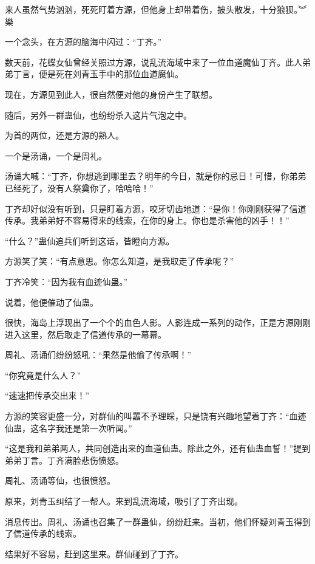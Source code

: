 
\begin{this_body}

来人虽然气势汹汹，死死盯着方源，但他身上却带着伤，披头散发，十分狼狈。︾樂

一个念头，在方源的脑海中闪过：“丁齐。”

数天前，花蝶女仙曾经关照过方源，说乱流海域中来了一位血道魔仙丁齐。此人弟弟丁言，便是死在刘青玉手中的那位血道魔仙。

现在，方源见到此人，很自然便对他的身份产生了联想。

随后，另外一群蛊仙，也纷纷杀入这片气泡之中。

为首的两位，还是方源的熟人。

一个是汤诵，一个是周礼。

汤诵大喊：“丁齐，你想逃到哪里去？明年的今日，就是你的忌日！可惜，你弟弟已经死了，没有人祭奠你了，哈哈哈！”

丁齐却好似没有听到，只是盯着方源，咬牙切齿地道：“是你！你刚刚获得了信道传承。我弟弟好不容易得来的线索，在你的身上。你也是杀害他的凶手！！”

“什么？”蛊仙追兵们听到这话，皆瞪向方源。

方源笑了笑：“有点意思。你怎么知道，是我取走了传承呢？”

丁齐冷笑：“因为我有血迹仙蛊。”

说着，他便催动了仙蛊。

很快，海岛上浮现出了一个个的血色人影。人影连成一系列的动作，正是方源刚刚进入这里，然后取走了信道传承的一幕幕。

周礼、汤诵们纷纷怒吼：“果然是他偷了传承啊！”

“你究竟是什么人？”

“速速把传承交出来！”

方源的笑容更盛一分，对群仙的叫嚣不予理睬，只是饶有兴趣地望着丁齐：“血迹仙蛊，这名字我还是第一次听闻。”

“这是我和弟弟两人，共同创造出来的血道仙蛊。除此之外，还有仙蛊血誓！”提到弟弟丁言。丁齐满脸悲伤愤怒。

周礼、汤诵等仙，也很愤怒。

原来，刘青玉纠结了一帮人。来到乱流海域，吸引了丁齐出现。

消息传出。周礼、汤诵也召集了一群蛊仙，纷纷赶来。当初，他们怀疑刘青玉得到了信道传承的线索。

结果好不容易，赶到这里来。群仙碰到了丁齐。


\end{this_body}
